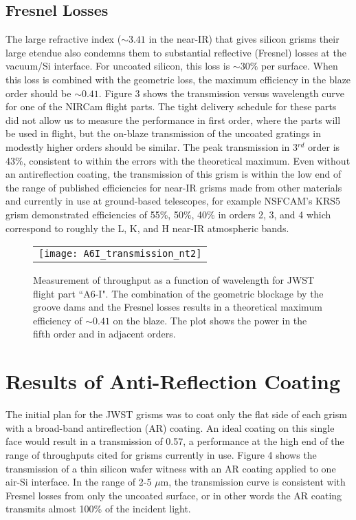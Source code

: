\subsection{Fresnel Losses}
The large refractive index ($\sim 3.41$ in the near-IR) that gives silicon grisms their large etendue also condemns them to substantial reflective (Fresnel) losses at the vacuum/Si interface.  For uncoated silicon, this loss is $\sim 30\%$ per surface.  When this loss is combined with the geometric loss, the maximum efficiency in the blaze order should be $\sim 0.41$.  Figure 3 shows the transmission versus wavelength curve for one of the NIRCam flight parts.  The tight delivery schedule for these parts did not allow us to measure the performance in first order, where the parts will be used in flight, but the on-blaze transmission of the uncoated gratings in modestly higher orders should be similar.  The peak transmission in 3$^{rd}$ order is 43\%, consistent to within the errors with the theoretical maximum. Even without an antireflection coating, the transmission of this grism is within the low end of the range of published efficiencies for near-IR grisms made from other materials and currently in use at ground-based telescopes, for example NSFCAM's KRS5 grism\cite{Rayner98} demonstrated  efficiencies of 55\%, 50\%, 40\% in orders 2, 3, and 4 which correspond to roughly the L, K, and H near-IR atmospheric bands.  

   \begin{figure}
   \begin{center}
   \begin{tabular}{c}
   \texttt{[image: A6I\_transmission\_nt2]}
   \end{tabular}
   \end{center}
   \caption[JWST grism transmission] {\label{fig:im3}  Measurement of throughput as a function of wavelength for JWST flight part ``A6-I".  The combination of the geometric blockage by the groove dams and the Fresnel losses results in a theoretical maximum efficiency of $\sim 0.41$ on the blaze.  The plot shows the power in the fifth order and in adjacent orders.} 
   \end{figure} 

\section{Results of Anti-Reflection Coating}
The initial plan for the JWST grisms was to coat only the flat side of each grism with a broad-band antireflection (AR) coating.  An ideal coating on this single face would result in a transmission of 0.57, a performance at the high end of the range of throughputs cited for grisms currently in use.  Figure 4 shows the transmission of a thin silicon wafer witness with an AR coating applied to one air-Si interface.  In the range of 2-5 $\mu$m, the transmission curve is consistent with Fresnel losses from only the uncoated surface, or in other words the AR coating transmits almost 100\% of the incident light.  

